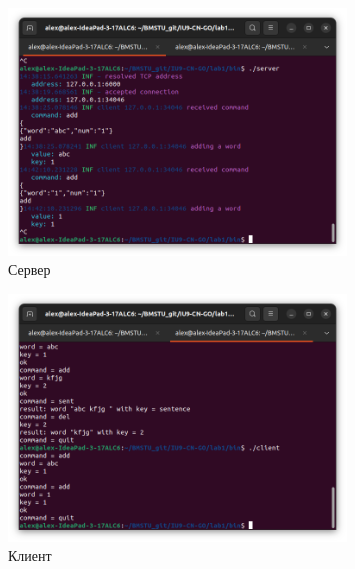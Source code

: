 \documentclass[a4paper, 14pt]{extarticle}
\begin{document}
\newpage

\begin{figure}[!htb]
	\centering
	\includegraphics[width=0.8\textwidth]{res1.png}
\caption{Сервер}
\label{fig:img1}
\end{figure}
\begin{figure}[!htb]
	\centering
	\includegraphics[width=0.8\textwidth]{res2.png}
\caption{Клиент}
\label{fig:img2}
\end{figure}
\end{document}
